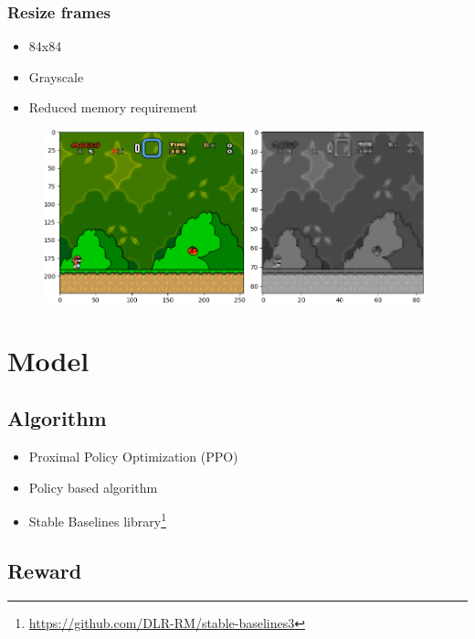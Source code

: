 \documentclass{article}
\begin{document}
    \subsubsection*{Resize frames}
    \begin{itemize}
        \item 84x84
        \item Grayscale
        \item Reduced memory requirement
    \end{itemize}
    \begin{figure}[H]
        \centering
        \includegraphics[height=5cm]{original}\hfill
        \includegraphics[height=5cm]{scaled}
    \end{figure}

    \section{Model}
    \subsection{Algorithm}
    \begin{itemize}
        \item Proximal Policy Optimization (PPO)
        \item Policy based algorithm
        \item Stable Baselines library\footnote{\url{https://github.com/DLR-RM/stable-baselines3}}
    \end{itemize}
    \subsection{Reward}
\end{document}
